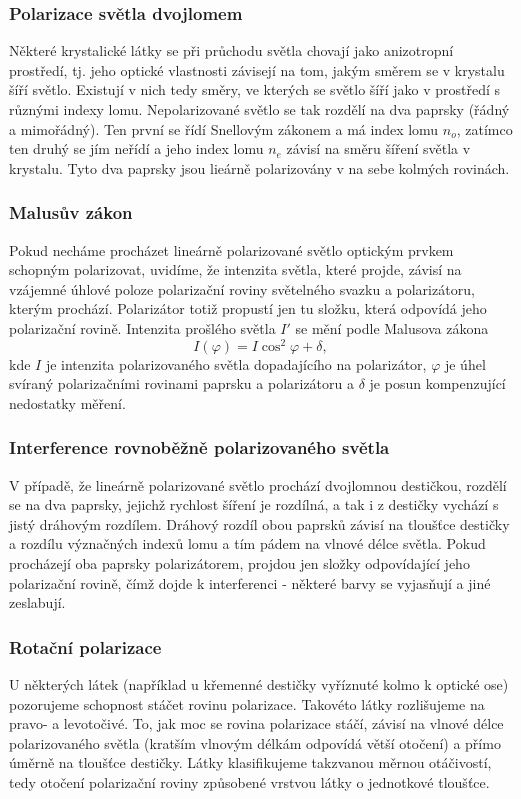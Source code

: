 \documentclass[english]{article}
\begin{document}
		\subsubsection{Polarizace světla dvojlomem}
		Některé krystalické látky se při průchodu světla chovají jako anizotropní prostředí, tj. jeho optické vlastnosti závisejí na tom, jakým směrem se v krystalu šíří světlo. Existují v nich tedy směry, ve kterých se světlo šíří jako v prostředí s různými indexy lomu. Nepolarizované světlo se tak rozdělí na dva paprsky (řádný a mimořádný). Ten první se řídí Snellovým zákonem a má index lomu $n_o$, zatímco ten druhý se jím neřídí a jeho index lomu $n_e$ závisí na směru šíření světla v krystalu. Tyto dva paprsky jsou lieárně polarizovány v na sebe kolmých rovinách.
		
		\subsubsection{Malusův zákon}
		Pokud necháme procházet lineárně polarizované světlo optickým prvkem schopným polarizovat, uvidíme, že intenzita světla, které projde, závisí na vzájemné úhlové poloze polarizační roviny světelného svazku a polarizátoru, kterým prochází. Polarizátor totiž propustí jen tu složku, která odpovídá jeho polarizační rovině. Intenzita prošlého světla $I'$ se mění podle Malusova zákona
		\begin{equation}
		I(\varphi) = I \cos^2 \varphi + \delta,
		\label{eq:malusuv_zakon}
		\end{equation}
		kde $I$ je intenzita polarizovaného světla dopadajícího na polarizátor, $\varphi$ je úhel svíraný polarizačními rovinami paprsku a polarizátoru a $\delta$ je posun kompenzující nedostatky měření.
		
		\subsubsection{Interference rovnoběžně polarizovaného světla}
		V případě, že lineárně polarizované světlo prochází dvojlomnou destičkou, rozdělí se na dva paprsky, jejichž rychlost šíření je rozdílná, a tak i z destičky vychází s jistý dráhovým rozdílem. Dráhový rozdíl obou paprsků závisí na tloušťce destičky a rozdílu význačných indexů lomu a tím pádem na vlnové délce světla. Pokud procházejí oba paprsky polarizátorem, projdou jen složky odpovídající jeho polarizační rovině, čímž dojde k interferenci - některé barvy se vyjasňují a jiné zeslabují.
		
		\subsubsection{Rotační polarizace}
		U některých látek (například u křemenné destičky vyříznuté kolmo k optické ose) pozorujeme schopnost stáčet rovinu polarizace. Takovéto látky rozlišujeme na pravo- a levotočivé. To, jak moc se rovina polarizace stáčí, závisí na vlnové délce polarizovaného světla (kratším vlnovým délkám odpovídá větší otočení) a přímo úměrně na tloušťce destičky. Látky klasifikujeme takzvanou měrnou otáčivostí, tedy otočení polarizační roviny způsobené vrstvou látky o jednotkové tloušťce.
		
\end{document}
